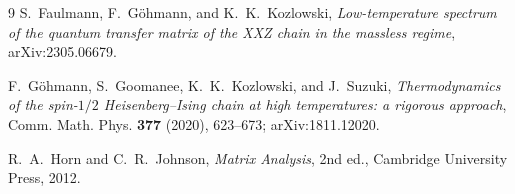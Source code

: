 \documentclass[11pt]{article}
\begin{document}
\begin{thebibliography}{9}
S.~Faulmann, F.~G\"ohmann, and K.~K.~Kozlowski,
\emph{Low-temperature spectrum of the quantum transfer matrix of the XXZ
chain in the massless regime}, arXiv:2305.06679.

F.~G\"ohmann, S.~Goomanee, K.~K.~Kozlowski, and J.~Suzuki,
\emph{Thermodynamics of the spin-$1/2$ Heisenberg--Ising chain at high
temperatures: a rigorous approach}, Comm. Math. Phys. \textbf{377} (2020),
623--673; arXiv:1811.12020.

R.~A.~Horn and C.~R.~Johnson, \emph{Matrix Analysis}, 2nd ed., Cambridge
University Press, 2012.
\end{thebibliography}
\end{document}
